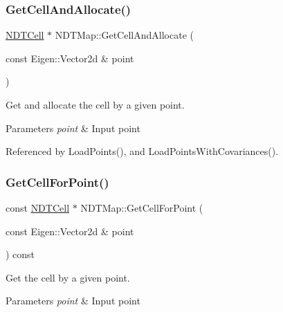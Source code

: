 \mbox{\label{classNDTMap_ab37c2e140bf7b138be3cd0b4d5104dfc}} 
\subsubsection{\texorpdfstring{Get\+Cell\+And\+Allocate()}{GetCellAndAllocate()}}
{\footnotesize\ttfamily \hyperlink{classNDTCell}{N\+D\+T\+Cell} $\ast$ N\+D\+T\+Map\+::\+Get\+Cell\+And\+Allocate (\begin{DoxyParamCaption}\item[{const Eigen\+::\+Vector2d \&}]{point }\end{DoxyParamCaption})}



Get and allocate the cell by a given point. 


\begin{DoxyParams}{Parameters}
{\em point} & Input point \\
\hline
\end{DoxyParams}


Referenced by Load\+Points(), and Load\+Points\+With\+Covariances().

\mbox{\label{classNDTMap_aa8c796e4bf0512e4d640887d228b2404}} 
\subsubsection{\texorpdfstring{Get\+Cell\+For\+Point()}{GetCellForPoint()}}
{\footnotesize\ttfamily const \hyperlink{classNDTCell}{N\+D\+T\+Cell} $\ast$ N\+D\+T\+Map\+::\+Get\+Cell\+For\+Point (\begin{DoxyParamCaption}\item[{const Eigen\+::\+Vector2d \&}]{point }\end{DoxyParamCaption}) const}



Get the cell by a given point. 


\begin{DoxyParams}{Parameters}
{\em point} & Input point \\
\hline
\end{DoxyParams}
\mbox{\label{classNDTMap_a2b44ded259db4af8c4abffed0553e6c0}} 
